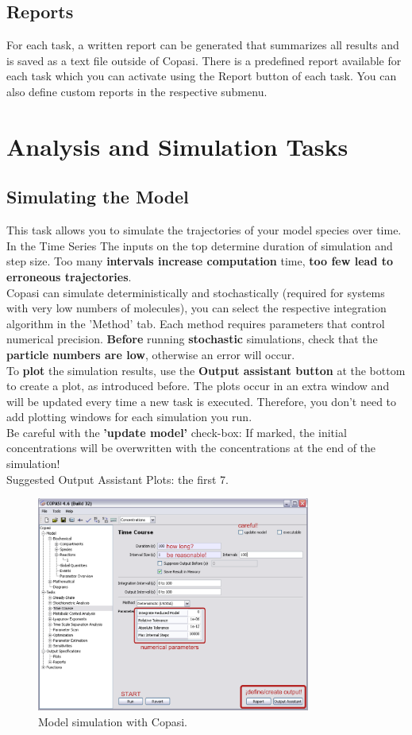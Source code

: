 \documentclass[a4paper,11pt,twoside]{article}
\begin{document}
\subsection{Reports}
\label{sub:Reports}
For each task, a written report can be generated that summarizes all results and is saved as a text file outside of Copasi. There is a predefined report available for each task which you can activate using the Report button of each task. You can also define custom reports in the respective submenu.

\newpage
\section{Analysis and Simulation Tasks}
\subsection{Simulating the Model}
\label{sub:TC}
This task allows you to simulate the trajectories of your model species over time.\\
In the Time Series The inputs on the top determine duration of simulation and step  size.  Too many \textbf{intervals increase computation} time, \textbf{too few lead to erroneous  trajectories}.\\
Copasi can simulate deterministically and stochastically (required for systems with very low numbers of molecules), you can select the respective integration algorithm in the 'Method' tab. Each method requires parameters that control numerical precision. \textbf{Before} running \textbf{stochastic} simulations, check that the \textbf{particle numbers are low}, otherwise an error will occur.\\
To \textbf{plot} the simulation results, use the \textbf{Output  assistant button} at the bottom to create a plot, as introduced before. The plots occur in an extra window and will be updated every time a new task is executed. Therefore, you don't need to add  plotting windows for each simulation you run.\\
Be careful with the \textbf{'update model'} check-box: If marked, the initial concentrations will be overwritten with the concentrations at the end of the simulation!\\
Suggested Output Assistant Plots: the first 7.

\begin{figure}[htb]
 \centering
 \includegraphics[width=09cm]{Pictures/CopasiSimulation.pdf}
 \caption{\footnotesize Model simulation with Copasi.}
 \label{fig:CS}
\end{figure}
\end{document}
